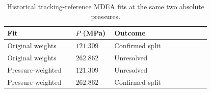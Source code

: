 \begin{table}[!htbp]\small\setlength{\tabcolsep}{2pt}\caption{Historical tracking-reference MDEA fits at the same two absolute pressures.}\label{tab:supplement-mdea-fixed-pressure}
\begin{tabular}{@{}>{\raggedright\arraybackslash}p{0.32\linewidth}>{\raggedright\arraybackslash}p{0.18\linewidth}>{\raggedright\arraybackslash}p{0.45\linewidth}@{}}
\toprule Fit & $P$ (MPa) & Outcome \\ \midrule
Original weights & $121.309$ & Confirmed split \\
Original weights & $262.862$ & Unresolved \\
Pressure-weighted & $121.309$ & Unresolved \\
Pressure-weighted & $262.862$ & Confirmed split \\
\bottomrule\end{tabular}
\par{}\end{table}
